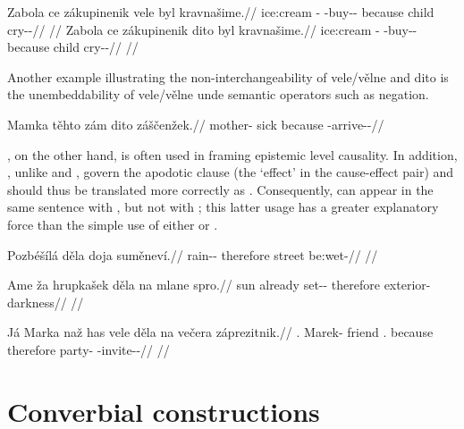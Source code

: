 \pex
\a\begingl
  \gla Zabola ce zákupinenik vele byl kravnašime.//
  \glb ice:cream \Dem{}-\Acc{} \Neg{}-buy-\Pv{}-\Pf{} because child cry-\Av{}-\Prog{}//
  \glft {}//
\endgl
\a\begingl
  \gla Zabola ce zákupinenik dito byl kravnašime.//
  \glb ice:cream \Dem{}-\Acc{} \Neg{}-buy-\Pv{}-\Pf{} because child cry-\Av{}-\Prog{}//
  \glft {}//
\endgl
\a {}
\a \ljudge{*}
\a {} 
\a {}
\xe 

Another example illustrating the non-interchangeability of vele/vělne and dito is the unembeddability of vele/vělne unde semantic operators such as negation.

\pex
\a\begingl
  \gla Mamka těhto zám dito záščenžek.//
  \glb mother-\Dim{} sick \Neg{} because \Neg{}-arrive-\Av{}-\Pf{}//
\endgl
\a \ljudge{*}
\xe

, on the other hand, is often used in framing epistemic level
causality. In addition, , unlike  and ,
govern the apodotic clause (the `effect' in the cause-effect pair) and should
thus be translated more correctly as . Consequently,
 can appear in the same sentence with , but not with
; this latter usage has a greater explanatory force than the simple
use of either  or .

\pex
\begingl
  \gla Pozbéšílá děla doja suměneví.//
  \glb rain-\Av{}-\SubjI{} therefore street be:wet-\Cont{}//
  \glft {}//
\endgl
\xe

\pex
\begingl
  \gla Ame ža hrupkašek děla na mlane spro.//
  \glb sun already set-\Av{}-\Pf{} therefore \Loc{} exterior-\Acc{} darkness//
  \glft {}//
\endgl
\xe

\pex
\begingl
  \gla Já Marka naž has vele děla na večera záprezitnik.//
  \glb \Second{}\Sg{}.\Str{} Marek-\Acc{} friend \Cop.\Neg{} because therefore \Loc{} party-\Acc{} \Neg{}-invite-\Pv{}-\Pf{}//
  \glft {}//
\endgl
\xe




\section{Converbial constructions}\label{converbs-syntax}

